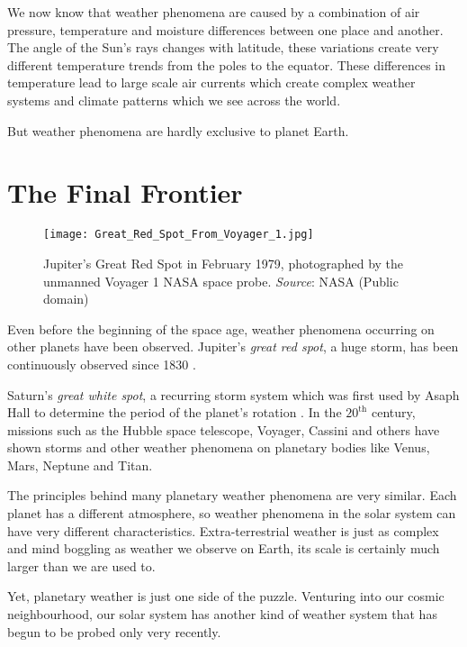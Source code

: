 We now know that weather phenomena are caused by a combination of air pressure, temperature and moisture differences 
between one place and another. The angle of the Sun's rays changes with latitude, these variations create very 
different temperature trends from the poles to the equator. These differences in temperature lead to large scale 
air currents which create complex weather systems and climate patterns which we see across the world.

But weather phenomena are hardly exclusive to planet Earth.

\section*{The Final Frontier}

\begin{wrapfigure}{r}{0.4\textwidth}
    \centering\texttt{[image: Great\_Red\_Spot\_From\_Voyager\_1.jpg]}
    \caption{
        \small Jupiter's Great Red Spot in February 1979, photographed by the unmanned Voyager 1 NASA space probe. 
        \textit{Source}: NASA (Public domain)
    }
    \label{fig:jupiter}
\end{wrapfigure}

Even before the beginning of the space age, weather phenomena occurring on other planets have been observed. Jupiter's 
\emph{great red spot}, a huge storm, has been continuously observed since 1830 
\citetext{see \citealp{britannicaRedSpot}}.

Saturn's \emph{great white spot}, a recurring storm system which was first used by Asaph Hall to determine the period of
the planet's rotation \citep{wikisaturn}. In the $20^{\text{th}}$ century, missions such as the Hubble space telescope, 
Voyager, Cassini and others have shown storms and other weather phenomena on planetary bodies like Venus, Mars, 
Neptune and Titan. 

The principles behind many planetary weather phenomena are very similar. Each planet has a different atmosphere, 
so weather phenomena in the solar system can have very different characteristics. Extra-terrestrial weather is just 
as complex and mind boggling as weather we observe on Earth, its scale is certainly much larger than we are used to. 

Yet, planetary weather is just one side of the puzzle. Venturing into our cosmic neighbourhood, our solar system
has another kind of weather system that has begun to be probed only very recently. 

